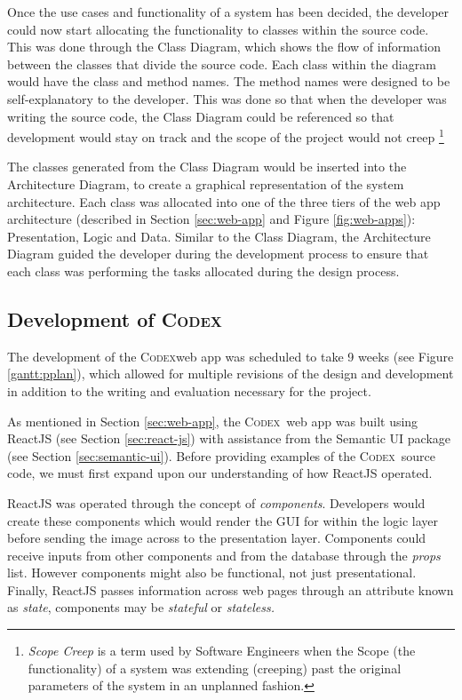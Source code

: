 \documentclass[final]{cmpreport}
\newcommand{\Codex}{\textsc{Codex}}
\begin{document}
		Once the use cases and functionality of a system has been decided, the developer could now start allocating the functionality to classes within the source code. This was done through the Class Diagram, which shows the flow of information between the classes that divide the source code. Each class within the diagram would have the class and method names. The method names were designed to be self-explanatory to the developer. This was done so that when the developer was writing the source code, the Class Diagram could be referenced so that development would stay on track and the scope of the project would not creep \footnote{\emph{Scope Creep} is a term used by Software Engineers when the Scope (the functionality) of a system was extending (creeping) past the original parameters of the system in an unplanned fashion.} 
		
		The classes generated from the Class Diagram would be inserted into the Architecture Diagram, to create a graphical representation of the system architecture. Each class was allocated into one of the three tiers of the web app architecture (described in Section \ref{sec:web-app} and Figure \ref{fig:web-apps}): Presentation, Logic and Data. Similar to the Class Diagram, the Architecture Diagram guided the developer during the development process to ensure that each class was performing the tasks allocated during the design process. 
		
		\subsection{Development of \Codex} \label{sec:codex-development}
		The development of the \Codex web app was scheduled to take 9 weeks (see Figure \ref{gantt:pplan}), which allowed for multiple revisions of the design and development in addition to the writing and evaluation necessary for the project. 
		
		As mentioned in Section \ref{sec:web-app}, the \Codex \ web app was built using ReactJS (see Section \ref{sec:react-js}) with assistance from the Semantic UI package (see Section \ref{sec:semantic-ui}). Before providing examples of the \Codex \ source code, we must first expand upon our understanding of how ReactJS operated.
		
		ReactJS was operated through the concept of \emph{components}. Developers would create these components which would render the GUI for within the logic layer before sending the image across to the presentation layer. Components could receive inputs from other components and from the database through the \emph{props} list. However components might also be functional, not just presentational. Finally, ReactJS passes information across web pages through an attribute known as \emph{state}, components may be \emph{stateful} or \emph{stateless.}
		
\end{document}
